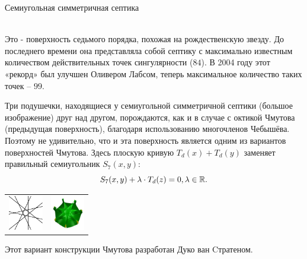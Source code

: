 \documentclass[ru]{./../../common/SurferDesc}%
\begin{document}
\footnotesize




\begin{surferPage}
  \begin{surferTitle}Семиугольная симметричная септика\end{surferTitle}   \\
Это - поверхность седьмого порядка, похожая на рождественскую звезду. До последнего времени она представляла собой септику с максимально известным количеством действительных точек сингулярности ($84$). В 2004 году этот «рекорд» был улучшен Оливером Лабсом, теперь максимальное количество таких точек – $99$.  
  
Три подушечки, находящиеся у семиугольной симметричной септики (большое изображение) друг над другом, порождаются, как и в случае с октикой Чмутова (предыдущая поверхность), благодаря использованию многочленов Чебышёва. Поэтому не удивительно, что и эта поверхность является одним из вариантов поверхностей Чмутова. Здесь плоскую кривую $T_d(x)+T_d(y)$ заменяет правильный семиугольник
    $S_7(x,y)$: 
   \[S_7(x,y) + \lambda \cdot T_d(z) = 0,\lambda\in{\mathbb R}.\]
    \vspace*{-1.75em}
    \begin{center}
      \begin{tabular}{c@{\qquad}c}
        \includegraphics[height=1.5cm]{./../../common/images/labsseptic1.pdf}
        &
        \includegraphics[height=1.5cm]{./../../common/images/septic_7eck_von_oben}
      \end{tabular}
    \end{center}
    \vspace*{-0.3em}   
	Этот вариант конструкции Чмутова разработан Дуко ван Cтратеном.

  \begin{surferText}
     \end{surferText}
\end{surferPage}
\end{document}
